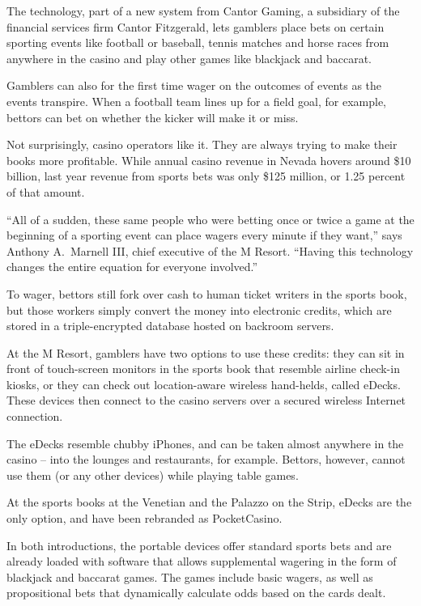 ﻿\documentclass[12pt]{article}
\begin{document}
The technology, part of a new system from Cantor Gaming, a subsidiary of the financial services firm
Cantor Fitzgerald, lets gamblers place bets on certain sporting events like football or baseball,
tennis matches and horse races from anywhere in the casino and play other games like blackjack and
baccarat.

Gamblers can also for the first time wager on the outcomes of events as the events transpire. When a
football team lines up for a field goal, for example, bettors can bet on whether the kicker will
make it or miss.

Not surprisingly, casino operators like it. They are always trying to make their books more
profitable. While annual casino revenue in Nevada hovers around \$10 billion, last year revenue from
sports bets was only \$125 million, or 1.25 percent of that amount.

``All of a sudden, these same people who were betting once or twice a game at the beginning of a
sporting event can place wagers every minute if they want,'' says Anthony A.~Marnell III, chief
executive of the M Resort. ``Having this technology changes the entire equation for everyone
involved.''

To wager, bettors still fork over cash to human ticket writers in the sports book, but those workers
simply convert the money into electronic credits, which are stored in a triple-encrypted database
hosted on backroom servers.

At the M Resort, gamblers have two options to use these credits: they can sit in front of
touch-screen monitors in the sports book that resemble airline check-in kiosks, or they can check
out location-aware wireless hand-helds, called eDecks. These devices then connect to the casino
servers over a secured wireless Internet connection.

The eDecks resemble chubby iPhones, and can be taken almost anywhere in the casino -- into the
lounges and restaurants, for example. Bettors, however, cannot use them (or any other devices) while
playing table games.

At the sports books at the Venetian and the Palazzo on the Strip, eDecks are the only option, and
have been rebranded as PocketCasino.

In both introductions, the portable devices offer standard sports bets and are already loaded with
software that allows supplemental wagering in the form of blackjack and baccarat games. The games
include basic wagers, as well as propositional bets that dynamically calculate odds based on the
cards dealt.
\end{document}
